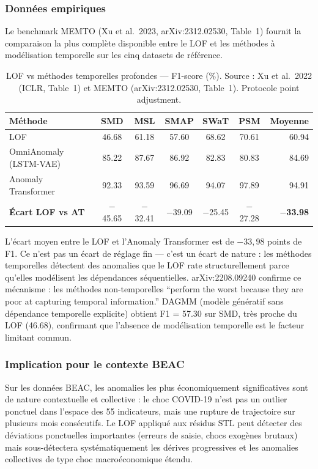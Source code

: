 \documentclass[12pt,a4paper]{article}
\begin{document}
\subsubsection{Données empiriques}

Le benchmark MEMTO (Xu et al.\ 2023, arXiv:2312.02530, Table~1) fournit la
comparaison la plus complète disponible entre le LOF et les méthodes à
modélisation temporelle sur les cinq datasets de référence.

\begin{table}[ht]
\centering
\caption{LOF vs méthodes temporelles profondes --- F1-score (\%).
Source : Xu et al.\ 2022 (ICLR, Table~1) et MEMTO (arXiv:2312.02530,
Table~1). Protocole point adjustment.}
\label{tab:l1-benchmark}
\small
\begin{tabular}{lcccccr}
\toprule
\textbf{Méthode} & \textbf{SMD} & \textbf{MSL} & \textbf{SMAP} &
\textbf{SWaT} & \textbf{PSM} & \textbf{Moyenne} \\
\midrule
LOF & 46.68 & 61.18 & 57.60 & 68.62 & 70.61 & 60.94 \\
OmniAnomaly (LSTM-VAE) & 85.22 & 87.67 & 86.92 & 82.83 & 80.83 & 84.69 \\
Anomaly Transformer & 92.33 & 93.59 & 96.69 & 94.07 & 97.89 & 94.91 \\
\midrule
\textbf{Écart LOF vs AT} &
$-$45.65 & $-$32.41 & $-$39.09 & $-$25.45 & $-$27.28 &
\textbf{$-$33.98} \\
\bottomrule
\end{tabular}
\end{table}

L'écart moyen entre le LOF et l'Anomaly Transformer est de $-33{,}98$ points
de F1. Ce n'est pas un écart de réglage fin --- c'est un écart de nature :
les méthodes temporelles détectent des anomalies que le LOF rate
structurellement parce qu'elles modélisent les dépendances séquentielles.
arXiv:2208.09240 confirme ce mécanisme : les méthodes non-temporelles
``perform the worst because they are poor at capturing temporal information.''
DAGMM (modèle génératif sans dépendance temporelle explicite) obtient
F1 = 57.30 sur SMD, très proche du LOF (46.68), confirmant que l'absence
de modélisation temporelle est le facteur limitant commun.

\subsubsection{Implication pour le contexte BEAC}

Sur les données BEAC, les anomalies les plus économiquement significatives
sont de nature contextuelle et collective : le choc COVID-19 n'est pas un
outlier ponctuel dans l'espace des 55 indicateurs, mais une rupture de
trajectoire sur plusieurs mois consécutifs. Le LOF appliqué aux résidus STL
peut détecter des déviations ponctuelles importantes (erreurs de saisie,
chocs exogènes brutaux) mais sous-détectera systématiquement les dérives
progressives et les anomalies collectives de type choc macroéconomique étendu.
\end{document}
